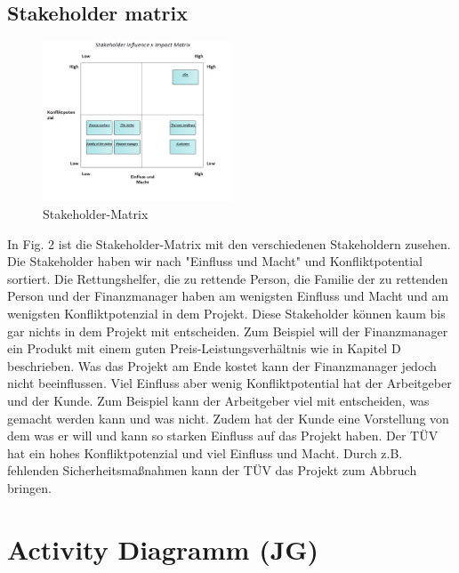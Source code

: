 \documentclass[conference]{IEEEtran}
\begin{document}
\subsection{Stakeholder matrix}

\begin{figure}[htbp]
	\centering
	\includegraphics[width=0.5\textwidth]{Stakeholder-Matrix}
	\caption{Stakeholder-Matrix}
\end{figure}

In Fig. 2 ist die Stakeholder-Matrix mit den verschiedenen Stakeholdern zusehen. Die Stakeholder haben wir nach "Einfluss und Macht" und Konfliktpotential sortiert. Die Rettungshelfer, die zu rettende Person, die Familie der zu rettenden Person und der Finanzmanager haben am wenigsten Einfluss und Macht und am wenigsten Konfliktpotenzial in dem Projekt. Diese Stakeholder können kaum bis gar nichts in dem Projekt mit entscheiden. Zum Beispiel will der Finanzmanager ein Produkt mit einem guten Preis-Leistungsverhältnis wie in Kapitel D beschrieben. Was das Projekt am Ende kostet kann der Finanzmanager jedoch nicht beeinflussen. Viel Einfluss aber wenig Konfliktpotential hat der Arbeitgeber und der Kunde. Zum Beispiel kann der Arbeitgeber viel mit entscheiden, was gemacht werden kann und was nicht. Zudem hat der Kunde eine Vorstellung von dem was er will und kann so starken Einfluss auf das Projekt haben. Der TÜV hat ein hohes Konfliktpotenzial und viel Einfluss und Macht. Durch z.B. fehlenden Sicherheitsmaßnahmen kann der TÜV das Projekt zum Abbruch bringen. 


\section{Activity Diagramm (JG)}
\end{document}
